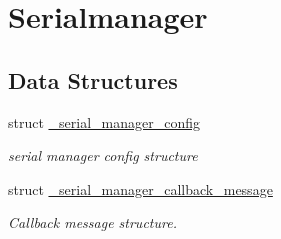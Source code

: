 \hypertarget{group__serialmanager}{}\section{Serialmanager}
\label{group__serialmanager}
\subsection*{Data Structures}
\begin{DoxyCompactItemize}
\item 
struct \mbox{\hyperlink{struct__serial__manager__config}{\+\_\+serial\+\_\+manager\+\_\+config}}
\begin{DoxyCompactList}\small\item\em serial manager config structure \end{DoxyCompactList}\item 
struct \mbox{\hyperlink{struct__serial__manager__callback__message}{\+\_\+serial\+\_\+manager\+\_\+callback\+\_\+message}}
\begin{DoxyCompactList}\small\item\em Callback message structure. \end{DoxyCompactList}\end{DoxyCompactItemize}
